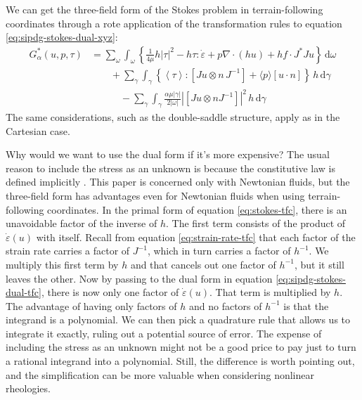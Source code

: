 \documentclass[gmd, manuscript]{copernicus}
\begin{document}
We can get the three-field form of the Stokes problem in terrain-following coordinates through a rote application of the transformation rules to equation \eqref{eq:sipdg-stokes-dual-xyz}:
\begin{subequations}
    \label{eq:sipdg-stokes-dual-tfc}
    \begin{align}
        G_\alpha^*(u, p, \tau) & = \sum_\omega\int_\omega\left\{\frac{1}{4\mu}h|\tau|^2 - h\tau:\dot\varepsilon + p\nabla\cdot(h u) + hf\cdot J^*Ju\right\}\,\mathrm{d}\omega \\
        & \qquad + \sum_\gamma\int_\gamma\left\{\left\langle\tau\right\rangle:[Ju\otimes n\,J^{-1}] + \langle p\rangle[u\cdot n] \right\}\,h\,\mathrm{d}\gamma \\
        & \quad\qquad - \sum_\gamma\int_\gamma\frac{\alpha\mu|\gamma|}{2|\omega|}|[Ju\otimes nJ^{-1}]|^2\,h\,\mathrm{d}\gamma \label{eq:sipdg-stokes-dual-tfc-penalty}
    \end{align}
\end{subequations}
The same considerations, such as the double-saddle structure, apply as in the Cartesian case.

Why would we want to use the dual form if it's more expensive?
The usual reason to include the stress as an unknown is because the constitutive law is defined implicitly \citep{farrell2020numerical}.
This paper is concerned only with Newtonian fluids, but the three-field form has advantages even for Newtonian fluids when using terrain-following coordinates.
In the primal form of equation \eqref{eq:stokes-tfc}, there is an unavoidable factor of the inverse of $h$.
The first term consists of the product of $\dot\varepsilon(u)$ with itself.
Recall from equation \eqref{eq:strain-rate-tfc} that each factor of the strain rate carries a factor of $J^{-1}$, which in turn carries a factor of $h^{-1}$.
We multiply this first term by $h$ and that cancels out one factor of $h^{-1}$, but it still leaves the other.
Now by passing to the dual form in equation \eqref{eq:sipdg-stokes-dual-tfc}, there is now only one factor of $\dot\varepsilon(u)$.
That term is multiplied by $h$.
The advantage of having only factors of $h$ and no factors of $h^{-1}$ is that the integrand is a polynomial.
We can then pick a quadrature rule that allows us to integrate it exactly, ruling out a potential source of error.
The expense of including the stress as an unknown might not be a good price to pay just to turn a rational integrand into a polynomial.
Still, the difference is worth pointing out, and the simplification can be more valuable when considering nonlinear rheologies.
\end{document}

